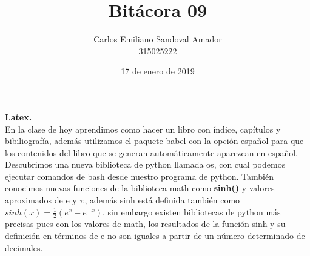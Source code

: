 \documentclass[letterpaper, 12pt, oneside]{article}%
\title{Bitácora 09}
\author{Carlos Emiliano Sandoval Amador \\ 315025222}
\date{17 de enero de 2019}
\begin{document}
	\maketitle %
	\textbf{\Large Latex.} \\ En la clase de hoy aprendimos como hacer un libro con índice, capítulos y bibiliografía, además utilizamos el paquete babel con la opción español para que los contenidos del libro que se generan automáticamente aparezcan en español. \\ Descubrimos una nueva biblioteca de python llamada os, con cual podemos ejecutar comandos de bash desde nuestro programa de python. También conocimos nuevas funciones de la biblioteca math como \textbf{sinh()} y valores aproximados de e y $\pi$, además sinh está definida también como $sinh(x) = \frac{1}{2}(e^{x}-e^{-x})$, sin embargo existen bibliotecas de python más precisas pues con los valores de math, los resultados de la función sinh y su definición en términos de e no son iguales a partir de un número determinado de decimales.
\end{document}
